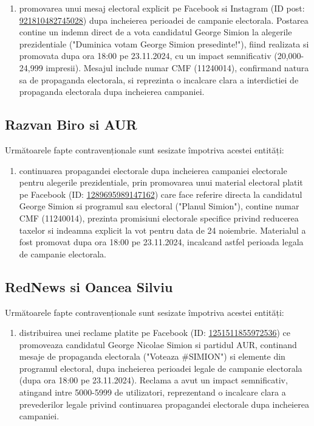 \documentclass[a4paper,12pt]{article}
\begin{document}
\begin{enumerate}[leftmargin=*, label=\arabic*.)]
    \item promovarea unui mesaj electoral explicit pe Facebook si Instagram (ID post: \href{https://www.facebook.com/ads/library/?id=921810482745028}{921810482745028}) dupa incheierea perioadei de campanie electorala. Postarea contine un indemn direct de a vota candidatul George Simion la alegerile prezidentiale ("Duminica votam George Simion presedinte!"), fiind realizata si promovata dupa ora 18:00 pe 23.11.2024, cu un impact semnificativ (20,000-24,999 impresii). Mesajul include numar CMF (11240014), confirmand natura sa de propaganda electorala, si reprezinta o incalcare clara a interdictiei de propaganda electorala dupa incheierea campaniei.
\end{enumerate}

\vspace{0.5cm}

\subsection{Razvan Biro si AUR}
Următoarele fapte contravenționale sunt sesizate împotriva acestei entități:

\begin{enumerate}[leftmargin=*, label=\arabic*.)]
    \item continuarea propagandei electorale dupa incheierea campaniei electorale pentru alegerile prezidentiale, prin promovarea unui material electoral platit pe Facebook (ID: \href{https://www.facebook.com/ads/library/?id=1289695989147162}{1289695989147162}) care face referire directa la candidatul George Simion si programul sau electoral ("Planul Simion"), contine numar CMF (11240014), prezinta promisiuni electorale specifice privind reducerea taxelor si indeamna explicit la vot pentru data de 24 noiembrie. Materialul a fost promovat dupa ora 18:00 pe 23.11.2024, incalcand astfel perioada legala de campanie electorala.
\end{enumerate}

\vspace{0.5cm}

\subsection{RedNews si Oancea Silviu}
Următoarele fapte contravenționale sunt sesizate împotriva acestei entități:

\begin{enumerate}[leftmargin=*, label=\arabic*.)]
    \item distribuirea unei reclame platite pe Facebook (ID: \href{https://www.facebook.com/ads/library/?id=1251511855972536}{1251511855972536}) ce promoveaza candidatul George Nicolae Simion si partidul AUR, continand mesaje de propaganda electorala ("Voteaza \#SIMION") si elemente din programul electoral, dupa incheierea perioadei legale de campanie electorala (dupa ora 18:00 pe 23.11.2024). Reclama a avut un impact semnificativ, atingand intre 5000-5999 de utilizatori, reprezentand o incalcare clara a prevederilor legale privind continuarea propagandei electorale dupa incheierea campaniei.
\end{enumerate}
\end{document}
